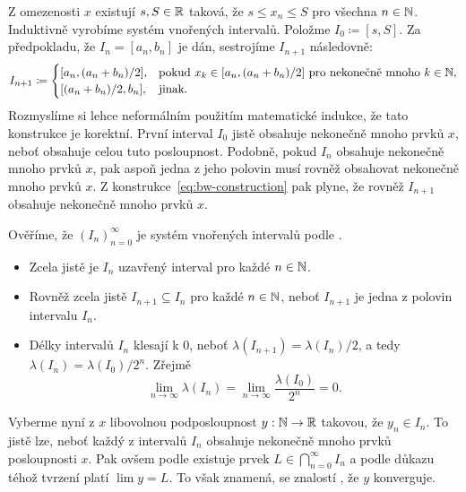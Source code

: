\begin{thmproof}
 Z omezenosti $x$ existují $s,S \in \mathbb{R}$ taková, že $s \leq x_n \leq S$ pro
 všechna $n \in \mathbb{N}$. Induktivně vyrobíme systém vnořených intervalů. Položme
 $I_0 \coloneqq [s,S]$. Za předpokladu, že $I_n = [a_n,b_n]$ je dán, sestrojíme
 $I_{n+1}$ následovně:
 \begin{equation}
  \label{eq:bw-construction}
  I_{n+1} \coloneqq \begin{cases}
   [a_n, (a_n+b_n) / 2], &\text{pokud } x_k \in [a_n, (a_n+b_n) / 2] \text{ pro
   nekonečně mnoho } k \in \mathbb{N},\\
    [ (a_n+b_n) / 2,b_n ], &\text{jinak}.
  \end{cases}
 \end{equation}
 Rozmyslíme si lehce neformálním použitím matematické indukce, že tato
 konstrukce je korektní. První interval $I_0$ jistě obsahuje nekonečně mnoho
 prvků $x$, neboť obsahuje celou tuto posloupnost. Podobně, pokud $I_n$ obsahuje
 nekonečně mnoho prvků $x$, pak aspoň jedna z jeho polovin musí rovněž obsahovat
 nekonečně mnoho prvků $x$. Z konstrukce~\eqref{eq:bw-construction} pak plyne,
 že rovněž $I_{n+1}$ obsahuje nekonečně mnoho prvků $x$.

 Ověříme, že $(I_n)_{n=0}^{\infty}$ je systém vnořených intervalů podle
 .
 \begin{itemize}
  \item Zcela jistě je $I_n$ uzavřený interval pro každé $n \in \mathbb{N}$.
  \item Rovněž zcela jistě $I_{n+1} \subseteq I_n$ pro každé $n \in \mathbb{N}$, neboť
   $I_{n+1}$ je jedna z polovin intervalu $I_n$.
  \item Délky intervalů $I_n$ klesají k $0$, neboť $\lambda(I_{n+1}) =
   \lambda(I_n) / 2$, a tedy $\lambda(I_n) = \lambda(I_0) / 2^{n}$. Zřejmě
   \[
    \lim_{n \to \infty} \lambda(I_n) = \lim_{n \to \infty}
    \frac{\lambda(I_0)}{2^{n}} = 0.
   \]
 \end{itemize}
 Vyberme nyní z $x$ libovolnou podposloupnost $y:\mathbb{N} \to \mathbb{R}$ takovou, že $y_n \in
 I_n$. To jistě lze, neboť každý z intervalů $I_n$ obsahuje nekonečně mnoho
 prvků posloupnosti $x$. Pak ovšem podle 
 existuje prvek $L \in \bigcap_{n=0}^{\infty} I_n$ a podle důkazu téhož tvrzení
 platí $\lim y = L$. To však znamená, se znalostí
 , že $y$ konverguje.
\end{thmproof}

